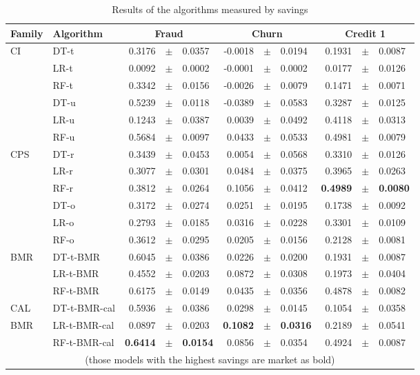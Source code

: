   \begin{table}[!b]
    \centering
    \footnotesize
    \begin{tabular}{l l r@{\hskip 0in}c@{\hskip 0in}l r@{\hskip 0in}c@{\hskip 0in}l r@{\hskip 
    0in}c@{\hskip 0in}l  } %
    \hline
    \bf{Family} & \bf{Algorithm} & \multicolumn{3}{c}{\bf{Fraud}} & 
    \multicolumn{3}{c}{\bf{Churn}} & \multicolumn{3}{c}{\bf{Credit 1}} \\ 
    \hline
CI&DT-t & 0.3176 &$\pm$& 0.0357 & -0.0018 &$\pm$& 0.0194 & 0.1931 &$\pm$& 0.0087\\ 
&LR-t & 0.0092 &$\pm$& 0.0002 & -0.0001 &$\pm$& 0.0002 & 0.0177 &$\pm$& 0.0126\\ 
&RF-t & 0.3342 &$\pm$& 0.0156 & -0.0026 &$\pm$& 0.0079 & 0.1471 &$\pm$& 0.0071\\ 
&DT-u & 0.5239 &$\pm$& 0.0118 & -0.0389 &$\pm$& 0.0583 & 0.3287 &$\pm$& 0.0125\\ 
&LR-u & 0.1243 &$\pm$& 0.0387 & 0.0039 &$\pm$& 0.0492 & 0.4118 &$\pm$& 0.0313\\ 
&RF-u & 0.5684 &$\pm$& 0.0097 & 0.0433 &$\pm$& 0.0533 & 0.4981 &$\pm$& 0.0079\\ 
\hline 
CPS&DT-r & 0.3439 &$\pm$& 0.0453 & 0.0054 &$\pm$& 0.0568 & 0.3310 &$\pm$& 0.0126\\ 
&LR-r & 0.3077 &$\pm$& 0.0301 & 0.0484 &$\pm$& 0.0375 & 0.3965 &$\pm$& 0.0263\\ 
&RF-r & 0.3812 &$\pm$& 0.0264 & 0.1056 &$\pm$& 0.0412 & \bf{0.4989} &\bf{$\pm$}& \bf{0.0080}\\ 
&DT-o & 0.3172 &$\pm$& 0.0274 & 0.0251 &$\pm$& 0.0195 & 0.1738 &$\pm$& 0.0092\\ 
&LR-o & 0.2793 &$\pm$& 0.0185 & 0.0316 &$\pm$& 0.0228 & 0.3301 &$\pm$& 0.0109\\ 
&RF-o & 0.3612 &$\pm$& 0.0295 & 0.0205 &$\pm$& 0.0156 & 0.2128 &$\pm$& 0.0081\\ 
\hline 
BMR&DT-t-BMR & 0.6045 &$\pm$& 0.0386 & 0.0226 &$\pm$& 0.0200 & 0.1931 &$\pm$& 0.0087\\ 
&LR-t-BMR & 0.4552 &$\pm$& 0.0203 & 0.0872 &$\pm$& 0.0308 & 0.1973 &$\pm$& 0.0404\\ 
&RF-t-BMR & 0.6175 &$\pm$& 0.0149 & 0.0435 &$\pm$& 0.0356 & 0.4878 &$\pm$& 0.0082\\ 
\hline 
CAL&DT-t-BMR-cal & 0.5936 &$\pm$& 0.0386 & 0.0298 &$\pm$& 0.0145 & 0.1054 &$\pm$& 0.0358\\ 
BMR&LR-t-BMR-cal & 0.0897 &$\pm$& 0.0203 & \bf{0.1082} &\bf{$\pm$}& \bf{0.0316} & 0.2189 &$\pm$& 
0.0541\\ 
&RF-t-BMR-cal & \bf{0.6414} &\bf{$\pm$}& \bf{0.0154} & 0.0856 &$\pm$& 0.0354 & 0.4924 &$\pm$& 
0.0087\\  
\hline
  \multicolumn{11}{c}{(those models with the highest savings are market as bold)}
  \end{tabular}
    \caption{Results of the algorithms measured by savings}
    \label{tab:6:results_savings}
  \end{table}
  
